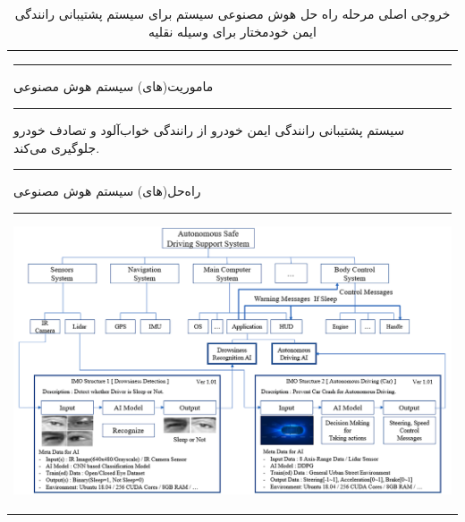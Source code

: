\documentclass[a4paper,10pt]{article}
\begin{document}
    \newpage

    
    \begin{table}[htbp]
                
        \centering
        \caption{خروجی اصلی مرحله راه حل هوش مصنوعی سیستم برای سیستم پشتیبانی رانندگی ایمن خودمختار برای وسیله نقلیه}

        \vspace{-5pt}

        \begin{tabularx}{\textwidth}{ X }
            
            \hrule

            ماموریت(های) سیستم هوش مصنوعی 

            \vspace{3pt}
            
            \hrule

            \vspace{3pt}

            سیستم پشتیبانی رانندگی ایمن خودرو از رانندگی خواب‌آلود و تصادف خودرو جلوگیری می‌کند. 

            \vspace{3pt}

            \hrule

            \vspace{3pt}

            راه‌حل(های) سیستم هوش مصنوعی 

            \vspace{3pt}

            \hrule

            \vspace{3pt}

            \includegraphics[width=1\linewidth]{image/fig table 5.png} 


\end{tabularx}
\end{table}
\end{document}

